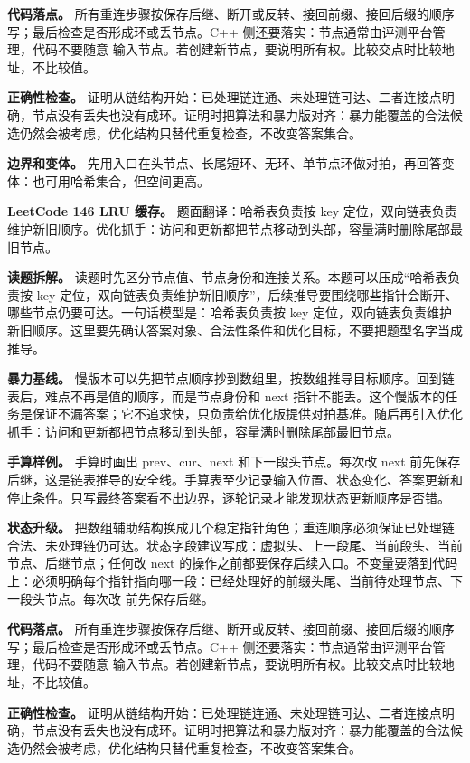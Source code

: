 \textbf{代码落点。} 所有重连步骤按保存后继、断开或反转、接回前缀、接回后缀的顺序写；最后检查是否形成环或丢节点。C++ 侧还要落实：节点通常由评测平台管理，代码不要随意  输入节点。若创建新节点，要说明所有权。比较交点时比较地址，不比较值。

\textbf{正确性检查。} 证明从链结构开始：已处理链连通、未处理链可达、二者连接点明确，节点没有丢失也没有成环。证明时把算法和暴力版对齐：暴力能覆盖的合法候选仍然会被考虑，优化结构只替代重复检查，不改变答案集合。

\textbf{边界和变体。} 先用入口在头节点、长尾短环、无环、单节点环做对拍，再回答变体：也可用哈希集合，但空间更高。

\noindent\textbf{LeetCode 146 LRU 缓存。} 题面翻译：哈希表负责按 key 定位，双向链表负责维护新旧顺序。优化抓手：访问和更新都把节点移动到头部，容量满时删除尾部最旧节点。

\textbf{读题拆解。} 读题时先区分节点值、节点身份和连接关系。本题可以压成“哈希表负责按 key 定位，双向链表负责维护新旧顺序”，后续推导要围绕哪些指针会断开、哪些节点仍要可达。一句话模型是：哈希表负责按 key 定位，双向链表负责维护新旧顺序。这里要先确认答案对象、合法性条件和优化目标，不要把题型名字当成推导。

\textbf{暴力基线。} 慢版本可以先把节点顺序抄到数组里，按数组推导目标顺序。回到链表后，难点不再是值的顺序，而是节点身份和 next 指针不能丢。这个慢版本的任务是保证不漏答案；它不追求快，只负责给优化版提供对拍基准。随后再引入优化抓手：访问和更新都把节点移动到头部，容量满时删除尾部最旧节点。

\textbf{手算样例。} 手算时画出 prev、cur、next 和下一段头节点。每次改 next 前先保存后继，这是链表推导的安全线。手算表至少记录输入位置、状态变化、答案更新和停止条件。只写最终答案看不出边界，逐轮记录才能发现状态更新顺序是否错。

\textbf{状态升级。} 把数组辅助结构换成几个稳定指针角色；重连顺序必须保证已处理链合法、未处理链仍可达。状态字段建议写成：虚拟头、上一段尾、当前段头、当前节点、后继节点；任何改 next 的操作之前都要保存后续入口。不变量要落到代码上：必须明确每个指针指向哪一段：已经处理好的前缀头尾、当前待处理节点、下一段头节点。每次改  前先保存后继。

\textbf{代码落点。} 所有重连步骤按保存后继、断开或反转、接回前缀、接回后缀的顺序写；最后检查是否形成环或丢节点。C++ 侧还要落实：节点通常由评测平台管理，代码不要随意  输入节点。若创建新节点，要说明所有权。比较交点时比较地址，不比较值。

\textbf{正确性检查。} 证明从链结构开始：已处理链连通、未处理链可达、二者连接点明确，节点没有丢失也没有成环。证明时把算法和暴力版对齐：暴力能覆盖的合法候选仍然会被考虑，优化结构只替代重复检查，不改变答案集合。

